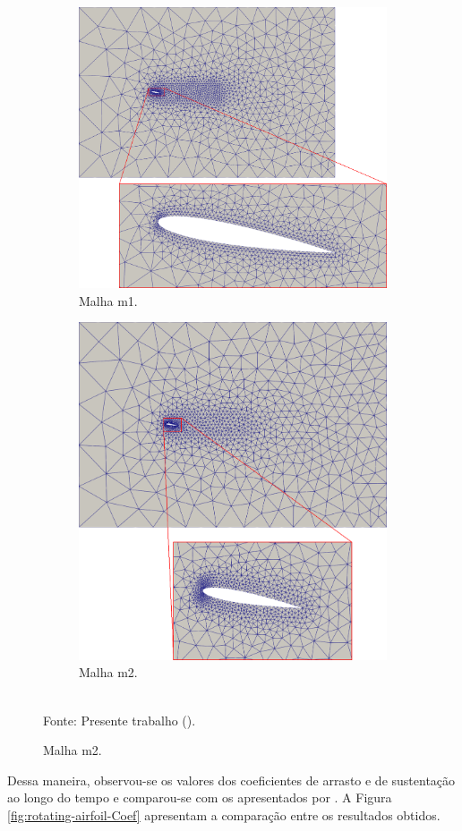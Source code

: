 \begin{figure}[h!]
    \centering
    \caption{Aerofólio com movimento de arfagem - Configuração inicial da malha.}
    \begin{subfigure}{\linewidth}
        \centering
        \includegraphics[width=.6\linewidth]{Figuras/rotating-airfoil/m1.png}
        \caption{Malha m1.}
    \end{subfigure}
    \begin{subfigure}{\linewidth}
        \centering
        \includegraphics[width=.6\linewidth]{Figuras/rotating-airfoil/m2.png}
        \caption{Malha m2.}
    \end{subfigure}
    \\Fonte: Presente trabalho (\the\year).
    \label{fig:rotating-airfoil}
\end{figure}

Dessa maneira, observou-se os valores dos coeficientes de arrasto e de sustentação ao longo do tempo e comparou-se com os apresentados por . A Figura \ref{fig:rotating-airfoil-Coef} apresentam a comparação entre os resultados obtidos.

